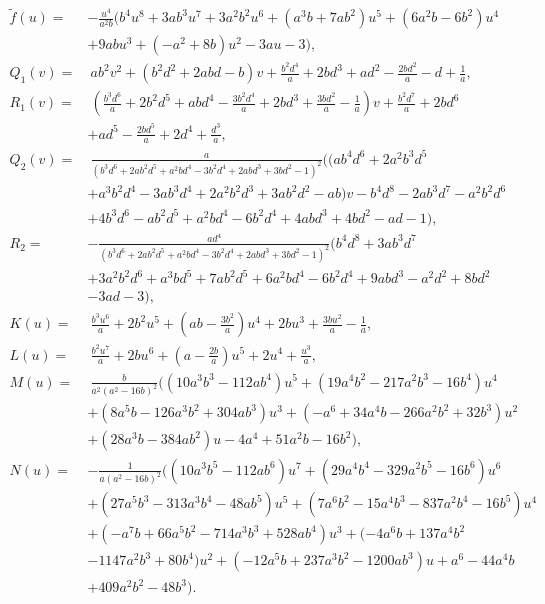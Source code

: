 \documentclass{gtpart}
\theoremstyle{definition}
\theoremstyle{remark}
\newcommand{\Tf}{\widetilde{f}}
\begin{document}
\begin{equation*}
\begin{split}
 \Tf(u) = & -\frac{u^4}{a^2 b} \big( b^4 u^8 + 3 a b^3 u^7 + 3 a^2 b^2 u^6 + (a^3 b + 7 a b^2) u^5 + (6 a^2 b - 6 b^2) u^4 \qquad~~ \\
          & + 9 a b u^3 + (-a^2 + 8 b) u^2 - 3 a u - 3 \big), \\
 Q_1(v) = & ~ a b^2 v^2 + (b^2 d^2 + 2 a b d - b) v + \frac{b^2 d^4}{a} + 2 b d^3 + a d^2 - \frac{2 b d^2}{a} - d + \frac{1}{a}, 
\end{split}
\end{equation*}
\begin{equation*}
\begin{split}
 R_1(v) = & ~ (\frac{b^3 d^6}{a} + 2 b^2 d^5 + a b d^4 - \frac{3 b^2 d^4}{a} + 2 b d^3 + \frac{3 b d^2}{a} - \frac{1}{a}) v + \frac{b^2 d^7}{a} + 2 b d^6 \\
          & + a d^5 - \frac{2 b d^5}{a} + 2 d^4 + \frac{d^3}{a}, \\
 Q_2(v) = & ~ \frac{a}{(b^3 d^6 + 2 a b^2 d^5 + a^2 b d^4 - 3 b^2 d^4 + 2 a b d^3 + 3 b d^2 - 1)^2} \big( (a b^4 d^6 + 2 a^2 b^3 d^5 \\
          & + a^3 b^2 d^4 - 3 a b^3 d^4 + 2 a^2 b^2 d^3 + 3 a b^2 d^2 - a b) v - b^4 d^8 - 2 a b^3 d^7 - a^2 b^2 d^6 \\
          & + 4 b^3 d^6 - a b^2 d^5 + a^2 b d^4 - 6 b^2 d^4 + 4 a b d^3 + 4 b d^2 - a d - 1 \big), \\
 R_2 = & - \frac{a d^4}{(b^3 d^6 + 2 a b^2 d^5 + a^2 b d^4 - 3 b^2 d^4 + 2 a b d^3 + 3 b d^2 - 1)^2} (b^4 d^8 + 3 a b^3 d^7 \\
       & + 3 a^2 b^2 d^6 + a^3 b d^5 + 7 a b^2 d^5 + 6 a^2 b d^4 - 6 b^2 d^4 + 9 a b d^3 - a^2 d^2 + 8 b d^2 \\
       & - 3 a d - 3), \\
 K(u) = & ~ \frac{b^3 u^6}{a} + 2 b^2 u^5 + (a b - \frac{3 b^2}{a}) u^4 + 2 b u^3 + \frac{3 b u^2}{a} - \frac{1}{a}, \\
 L(u) = & ~ \frac{b^2 u^7}{a} + 2 b u^6 + (a - \frac{2 b}{a}) u^5 + 2 u^4 + \frac{u^3}{a}, \\
 M(u) = & ~ \frac{b}{a^2 (a^2 - 16 b)^2} \big( (10 a^3 b^3 - 112 a b^4) u^5 + (19 a^4 b^2 - 217 a^2 b^3 - 16 b^4) u^4 \\
        & + (8 a^5 b - 126 a^3 b^2 + 304 a b^3) u^3 + (-a^6 + 34 a^4 b -266 a^2 b^2 +32 b^3) u^2 \\
        & + (28 a^3 b - 384 a b^2) u - 4 a^4 + 51 a^2 b - 16 b^2 \big), \\
 N(u) = & -\frac{1}{a (a^2 - 16 b)^2} \big( (10 a^3 b^5 - 112 a b^6) u^7 + (29 a^4 b^4 - 329 a^2 b^5 - 16 b^6) u^6 \\
        & + (27 a^5 b^3 - 313 a^3 b^4 - 48 a b^5 ) u^5 + (7 a^6 b^2 - 15 a^4 b^3 - 837 a^2 b^4 - 16 b^5) u^4 \\
        & + (-a^7 b + 66 a^5 b^2 - 714 a^3 b^3 + 528 a b^4) u^3 + (-4 a^6 b + 137 a^4 b^2 \\
        & - 1147 a^2 b^3 + 80 b^4) u^2 + (-12 a^5 b + 237 a^3 b^2 - 1200 a b^3) u + a^6 - 44 a^4 b \\
        & + 409 a^2 b^2 - 48 b^3 \big).  
\end{split}
\end{equation*}
\end{document}
